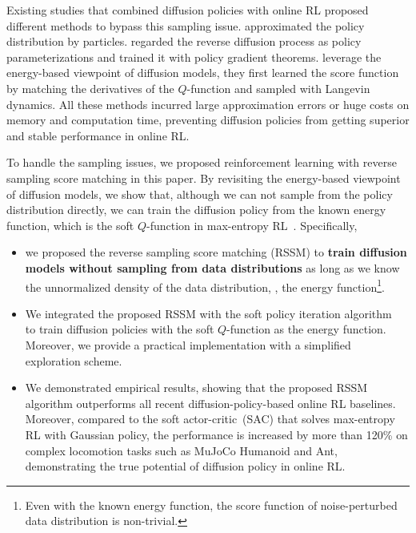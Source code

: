 Existing studies that combined diffusion policies with online RL \cite{psenka2023learning,yang2023policy,ding2024diffusion,wang2024diffusion} proposed different methods to bypass this sampling issue. \citet{yang2023policy} approximated the policy distribution by particles. \citet{ding2024diffusion,wang2024diffusion} regarded the reverse diffusion process as policy parameterizations and trained it with policy gradient theorems. \citet{psenka2023learning} leverage the energy-based viewpoint of diffusion models, they first learned the score function by matching the derivatives of the $Q$-function and sampled with Langevin dynamics. All these methods incurred large approximation errors or huge costs on memory and computation time, preventing diffusion policies from getting superior and stable performance in online RL. 

To handle the sampling issues, we proposed reinforcement learning with reverse sampling score matching in this paper. By revisiting the energy-based viewpoint of diffusion models, we show that, although we can not sample from the policy distribution directly, we can train the diffusion policy from the known energy function, which is the soft $Q$-function in max-entropy RL~\cite{haarnoja2017reinforcement}. Specifically,
\begin{itemize}
    \item we proposed the reverse sampling score matching (RSSM) to \textbf{train diffusion models without sampling from data distributions} as long as we know the unnormalized density of the data distribution, \ie, the energy function\footnote{Even with the known energy function, the score function of noise-perturbed data distribution is non-trivial.}.
    \item We integrated the proposed RSSM with the soft policy iteration algorithm~\cite{haarnoja2017reinforcement} to train diffusion policies with the soft $Q$-function as the energy function. Moreover, we provide a practical implementation with a simplified exploration scheme.
    
    \item We demonstrated empirical results, showing that the proposed RSSM algorithm outperforms all recent diffusion-policy-based online RL baselines. Moreover, compared to the soft actor-critic~(SAC) that solves max-entropy RL with Gaussian policy, the performance is increased by more than 120\% on complex locomotion tasks such as MuJoCo Humanoid and Ant, demonstrating the true potential of diffusion policy in online RL.
\end{itemize}

 

